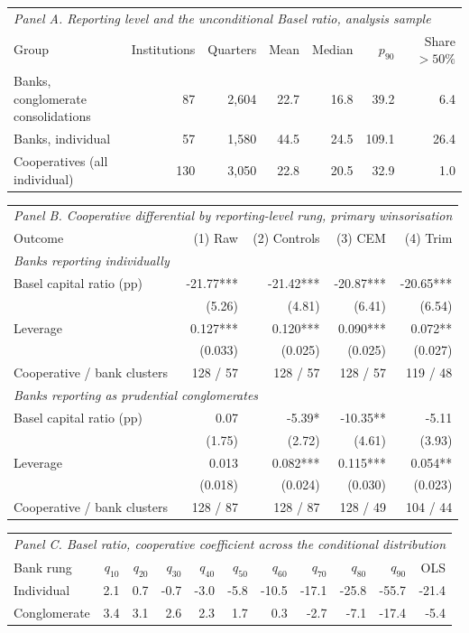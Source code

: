 \small
\setlength{\tabcolsep}{4pt}
\begin{tabular}{lrrrrrr}
\toprule
\multicolumn{7}{l}{\textit{Panel A. Reporting level and the unconditional Basel ratio, analysis sample}} \\
Group & Institutions & Quarters & Mean & Median & $p_{90}$ & Share $>50\%$ \\
\midrule
Banks, conglomerate consolidations & 87 & 2,604 & 22.7 & 16.8 & 39.2 & 6.4 \\
Banks, individual & 57 & 1,580 & 44.5 & 24.5 & 109.1 & 26.4 \\
Cooperatives (all individual) & 130 & 3,050 & 22.8 & 20.5 & 32.9 & 1.0 \\
\bottomrule
\end{tabular}
\par\medskip
\begin{tabular}{lrrrr}
\toprule
\multicolumn{5}{l}{\textit{Panel B. Cooperative differential by reporting-level rung, primary winsorisation}} \\
Outcome & (1) Raw & (2) Controls & (3) CEM & (4) Trim \\
\midrule
\multicolumn{5}{l}{\textit{Banks reporting individually}} \\
Basel capital ratio (pp) & -21.77*** & -21.42*** & -20.87*** & -20.65*** \\
 & (5.26) & (4.81) & (6.41) & (6.54) \\
Leverage & 0.127*** & 0.120*** & 0.090*** & 0.072** \\
 & (0.033) & (0.025) & (0.025) & (0.027) \\
Cooperative / bank clusters & 128 / 57 & 128 / 57 & 128 / 57 & 119 / 48 \\
\midrule
\multicolumn{5}{l}{\textit{Banks reporting as prudential conglomerates}} \\
Basel capital ratio (pp) & 0.07 & -5.39* & -10.35** & -5.11 \\
 & (1.75) & (2.72) & (4.61) & (3.93) \\
Leverage & 0.013 & 0.082*** & 0.115*** & 0.054** \\
 & (0.018) & (0.024) & (0.030) & (0.023) \\
Cooperative / bank clusters & 128 / 87 & 128 / 87 & 128 / 49 & 104 / 44 \\
\bottomrule
\end{tabular}
\par\medskip
\begin{tabular}{lrrrrrrrrrr}
\toprule
\multicolumn{11}{l}{\textit{Panel C. Basel ratio, cooperative coefficient across the conditional distribution}} \\
Bank rung & $q_{10}$ & $q_{20}$ & $q_{30}$ & $q_{40}$ & $q_{50}$ & $q_{60}$ & $q_{70}$ & $q_{80}$ & $q_{90}$ & OLS \\
\midrule
Individual & 2.1 & 0.7 & -0.7 & -3.0 & -5.8 & -10.5 & -17.1 & -25.8 & -55.7 & -21.4 \\
Conglomerate & 3.4 & 3.1 & 2.6 & 2.3 & 1.7 & 0.3 & -2.7 & -7.1 & -17.4 & -5.4 \\
\bottomrule
\end{tabular}

